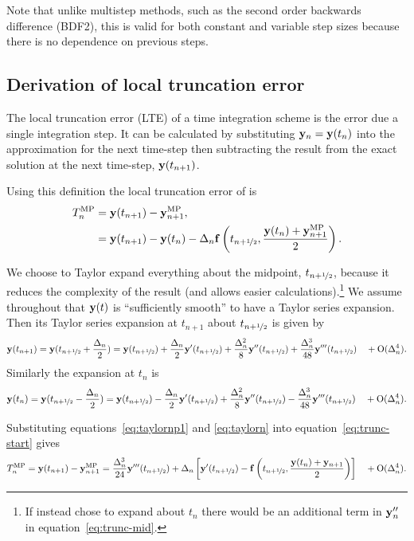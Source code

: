 Note that unlike multistep methods, such as the second order backwards difference (BDF2), this is valid for both constant and variable step sizes because there is no dependence on previous steps.


\subsection{Derivation of local truncation error}
\label{sec:deriv-local-trunc}

The local truncation error (LTE) of a time integration scheme is the error due a single integration step.
It can be calculated by substituting $\mathbf{y}_n = \mathbf{y}(t_n)$ into the approximation for the next time-step then subtracting the result from the exact solution at the next time-step, $\mathbf{y}(t_{n+1})$.

Using this definition the local truncation error of \imr is
\begin{align}
  \lte^\IMP &= \yv(t_{n+1}) - \yv_{n+1}^\IMP, \notag\\
  &= \yv(t_{n+1}) - \yv(t_n) - \dtn \fv\left( \thf, \frac{\yv(t_n) + \yv_{n+1}^\IMP}{2} \right).
  \label{eq:trunc-start}
\end{align}

We choose to Taylor expand everything about the midpoint, $t_{n+\nicefrac{1}{2}}$, because it reduces the complexity of the result (and allows easier calculations).\footnote{If instead chose to expand about $t_n$ there would be an additional term in $\mathbf{y}_n''$ in equation~\eqref{eq:trunc-mid}.}
We assume throughout that $\mathbf{y}(t)$ is ``sufficiently smooth'' to have a Taylor series expansion. Then its Taylor series expansion at $t_{n+1}$ about $t_{n+\nicefrac{1}{2}}$ is given by
\begin{equation}
  \yv(t_{n+1}) = \yv(\thf + \frac{\dtn}{2}) = \yvhf + \frac{\dtn}{2} \yvhf['] + \frac{\dtn^2}{8} \yvhf[''] + \frac{\dtn^3}{48} \yvhf['''] \porder{\dtn^4}.
  \label{eq:taylornp1}
\end{equation}
Similarly the expansion at $t_n$ is
\begin{equation}
  \yv(t_n) = \yv(\thf - \frac{\dtn}{2}) = \yvhf - \frac{\dtn}{2} \yvhf['] + \frac{\dtn^2}{8} \yvhf[''] - \frac{\dtn^3}{48} \yvhf['''] \porder{\dtn^4}.
  \label{eq:taylorn}
\end{equation}

Substituting equations~\eqref{eq:taylornp1} and \eqref{eq:taylorn} into equation~\eqref{eq:trunc-start} gives
\begin{equation}
  \lte^\IMP = \yv(t_{n+1}) - \yv_{n+1}^\IMP
  = \frac{\dtn^3}{24} \yvhf[''']  + \dtn  \left[ \yvhf[']
  - \fv\left( \thf, \frac{\yv(t_n) + \yv_{n+1}}{2} \right) \right]  \porder{\dtn^4}.
  \label{eq:trunc-mid}
\end{equation}

